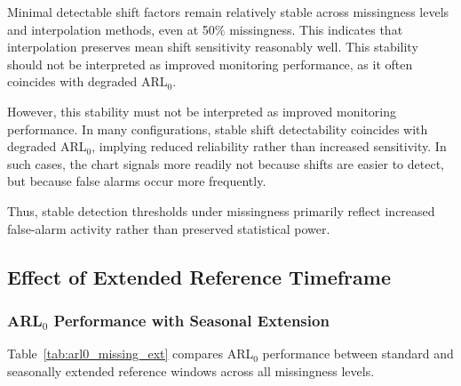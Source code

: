 Minimal detectable shift factors remain relatively stable across missingness levels and interpolation methods, even at 50\% missingness. This indicates that interpolation preserves mean shift sensitivity reasonably well. This stability should not be interpreted as improved monitoring performance, as it often coincides with degraded \ac{ARL}$_0$.

However, this stability must not be interpreted as improved monitoring performance. In many configurations, stable shift detectability coincides with degraded \ac{ARL}$_0$, implying reduced reliability rather than increased sensitivity. In such cases, the chart signals more readily not because shifts are easier to detect, but because false alarms occur more frequently.

Thus, stable detection thresholds under missingness primarily reflect increased false-alarm activity rather than preserved statistical power.


\subsection{Effect of Extended Reference Timeframe}

\subsubsection{\ac{ARL}$_0$ Performance with Seasonal Extension}

Table~\ref{tab:arl0_missing_ext} compares \ac{ARL}$_0$ performance between standard and seasonally extended reference windows across all missingness levels.

